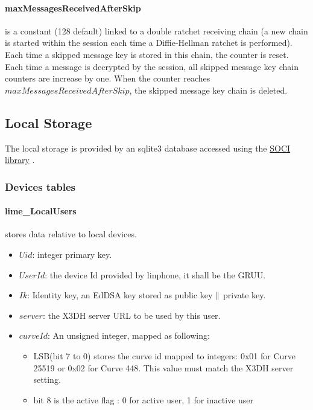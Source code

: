 \documentclass[a4paper,11pt]{article}
\begin{document}
      \paragraph{maxMessagesReceivedAfterSkip} is a constant (128 default) linked to a double ratchet receiving chain (a new chain is started within the session each time a Diffie-Hellman ratchet is performed). Each time a skipped message key is stored in this chain, the counter is reset. Each time a message is decrypted by the session, all skipped message key chain counters are increase by one. When the counter reaches $maxMessagesReceivedAfterSkip$, the skipped message key chain is deleted.
    

  \subsection{Local Storage}
    The local storage is provided by an sqlite3 database accessed using the \href{https://github.com/SOCI/soci}{SOCI library} \cite{libsoci}.
    \subsubsection{Devices tables}
    \paragraph*{lime\_LocalUsers} stores data relative to local devices.
    \begin{itemize}
      \item $Uid$: integer primary key.
      \item $UserId$: the device Id provided by linphone, it shall be the GRUU.
      \item $Ik$: Identity key, an EdDSA key stored as public key $\Arrowvert $ private key.
      \item $server$: the X3DH server URL to be used by this user.
      \item $curveId$: An unsigned integer, mapped as following:
        \begin{itemize}
          \item LSB(bit 7 to 0) stores the curve id mapped to integers: 0x01 for Curve 25519 or 0x02 for Curve 448. This value must match the X3DH server setting.
          \item bit 8 is the active flag : 0 for active user, 1 for inactive user
        \end{itemize}
    \end{itemize}
    
\end{document}
